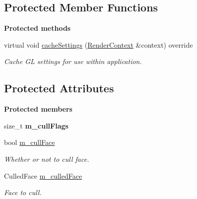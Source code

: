 \subsection*{Protected Member Functions}
\begin{Indent}\textbf{ Protected methods}\par
\begin{DoxyCompactItemize}
\item 
\mbox{\label{classrev_1_1_cull_face_setting_a7f52dd201d2d58cd1f8a1076caa70fba}} 
virtual void \mbox{\hyperlink{classrev_1_1_cull_face_setting_a7f52dd201d2d58cd1f8a1076caa70fba}{cache\+Settings}} (\mbox{\hyperlink{classrev_1_1_render_context}{Render\+Context}} \&context) override
\begin{DoxyCompactList}\small\item\em Cache GL settings for use within application. \end{DoxyCompactList}\end{DoxyCompactItemize}
\end{Indent}
\subsection*{Protected Attributes}
\begin{Indent}\textbf{ Protected members}\par
\begin{DoxyCompactItemize}
\item 
\mbox{\label{classrev_1_1_cull_face_setting_ad280220bcfc4184fb1e2b7d92d041dad}} 
size\+\_\+t {\bfseries m\+\_\+cull\+Flags}
\item 
\mbox{\label{classrev_1_1_cull_face_setting_aa10026487af0dee952c2ac7ad68f65bf}} 
bool \mbox{\hyperlink{classrev_1_1_cull_face_setting_aa10026487af0dee952c2ac7ad68f65bf}{m\+\_\+cull\+Face}}
\begin{DoxyCompactList}\small\item\em Whether or not to cull face. \end{DoxyCompactList}\item 
\mbox{\label{classrev_1_1_cull_face_setting_a94803a3d3e64c361b75ebed3124df994}} 
Culled\+Face \mbox{\hyperlink{classrev_1_1_cull_face_setting_a94803a3d3e64c361b75ebed3124df994}{m\+\_\+culled\+Face}}
\begin{DoxyCompactList}\small\item\em Face to cull. \end{DoxyCompactList}\end{DoxyCompactItemize}
\end{Indent}

